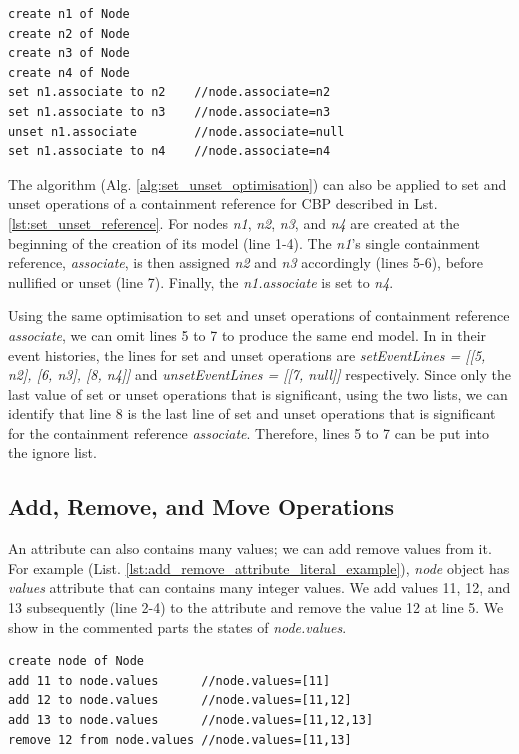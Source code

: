 \documentclass{llncs}
\begin{document}
\begin{lstlisting}[style=eol,caption={Example of CBP representation of \emph{name} reference assignments.},label=lst:set_unset_reference]
create n1 of Node
create n2 of Node
create n3 of Node
create n4 of Node
set n1.associate to n2    //node.associate=n2
set n1.associate to n3    //node.associate=n3
unset n1.associate        //node.associate=null
set n1.associate to n4    //node.associate=n4
\end{lstlisting}

The algorithm (Alg. \ref{alg:set_unset_optimisation}) can also be applied to set and unset operations of a containment reference for CBP described in Lst. \ref{lst:set_unset_reference}. For nodes \emph{n1}, \emph{n2}, \emph{n3}, and \emph{n4} are created at the beginning of the creation of its model (line 1-4). The \emph{n1}'s single containment reference, \emph{associate}, is then assigned \emph{n2} and \emph{n3} accordingly (lines 5-6), before nullified or unset (line 7). Finally, the \emph{n1.associate} is set to \emph{n4}. 

Using the same optimisation to set and unset operations of containment reference \emph{associate}, we can omit lines 5 to 7 to produce the same end model. In in their event histories, the lines for set and unset operations are \emph{setEventLines = [[5, n2], [6, n3], [8, n4]]} and \emph{unsetEventLines = [[7, null]]} respectively. Since only the last value of set or unset operations that is significant, using the two lists, we can identify that line 8 is the last line of set and unset operations that is significant for the containment reference \emph{associate}. Therefore, lines 5 to 7 can be put into the ignore list.

\subsection{Add, Remove, and Move Operations}
\label{subsec:add_remove_and_move_operations}
An attribute can also contains many values; we can add remove values from it. For example (List. \ref{lst:add_remove_attribute_literal_example}), \emph{node} object has \emph{values} attribute that can contains many integer values. We add values 11, 12, and 13 subsequently (line 2-4) to the attribute and remove the value 12 at line 5. We show in the commented parts the states of \emph{node.values}.  

\begin{lstlisting}[style=eol,caption={Example of CBP representation of attribute \emph{values}'s add and remove operations.},label=lst:add_remove_move_attribute]
create node of Node
add 11 to node.values      //node.values=[11] 
add 12 to node.values      //node.values=[11,12] 
add 13 to node.values      //node.values=[11,12,13] 
remove 12 from node.values //node.values=[11,13] 
\end{lstlisting}
\end{document}
